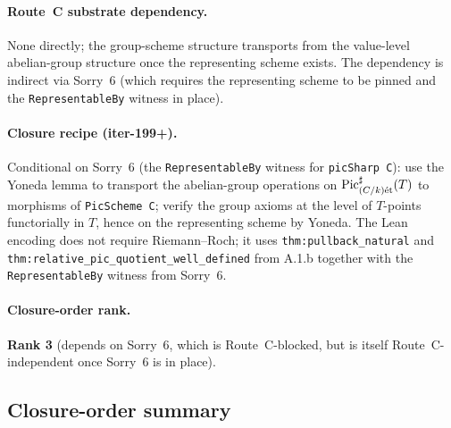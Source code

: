 \paragraph{Route~C substrate dependency.} None directly; the
group-scheme structure transports from the value-level abelian-group
structure once the representing scheme exists. The dependency is
indirect via Sorry~6 (which requires the representing scheme to be
pinned and the \texttt{RepresentableBy} witness in place).

\paragraph{Closure recipe (iter-199+).} Conditional on Sorry~6
(the \texttt{RepresentableBy} witness for \texttt{picSharp C}): use
the Yoneda lemma to transport the abelian-group operations on
$\operatorname{Pic}^\sharp_{(C/k)\mathrm{\acute{e}t}}(T)$ to morphisms of \texttt{PicScheme C};
verify the group axioms at the level of $T$-points functorially in
$T$, hence on the representing scheme by Yoneda. The Lean
encoding does not require Riemann--Roch; it uses
\texttt{thm:pullback_natural} and
\texttt{thm:relative_pic_quotient_well_defined} from A.1.b together
with the \texttt{RepresentableBy} witness from Sorry~6.

\paragraph{Closure-order rank.} \textbf{Rank 3} (depends on Sorry~6,
which is Route~C-blocked, but is itself Route~C-independent
once Sorry~6 is in place).

\subsection{Closure-order summary}
\label{subsec:fga_pic_closure_order_summary}

